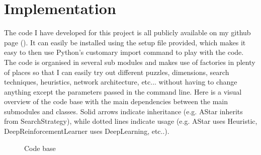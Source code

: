 
\chapter{Implementation} %

\label{sec:Implementation} %



The code I have developed for this project is all publicly available on my github page (\cite{FB}). It can easily be installed using the setup file provided, which makes it easy to then use Python's customary import command to play with the code.
The code is organised in several sub modules and makes use of factories in plenty of places so that I can easily try out different puzzles, dimensions, search techniques, heuristics, network architecture, etc... without having to change anything except the parameters passed in the command line. Here is a visual overview of the code base with the main dependencies between the main submodules and classes. Solid arrows indicate inheritance (e.g. AStar inherits from SearchStrategy), while dotted lines indicate usage (e.g. AStar uses Heuristic, DeepReinforcementLearner uses DeepLearning, etc..).



\begin{figure}[H]
  \noindent
  \caption[Codebase]{Code base}
  \label{fig:Codebase}
\end{figure}


